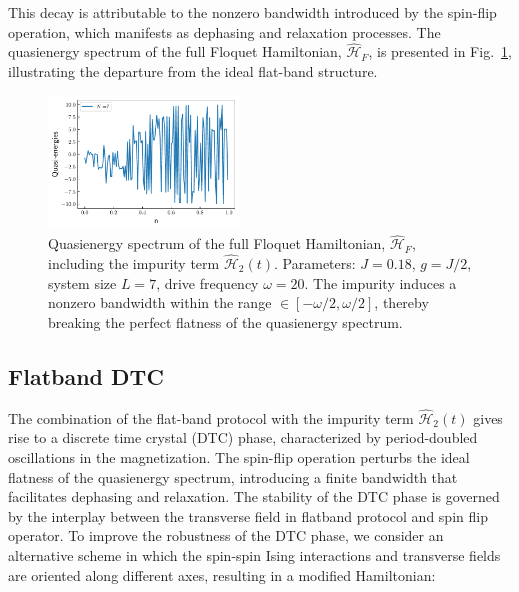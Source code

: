 \documentclass[a4paper, 10pt]{article}
\begin{document}
This decay is attributable to the nonzero bandwidth introduced by the spin-flip operation, which manifests as dephasing and relaxation processes. The quasienergy spectrum of the full Floquet Hamiltonian, $\hat{\mathcal{H}}_F$, is presented in Fig.~\ref{figs:impure_flatband_qe}, illustrating the departure from the ideal flat-band structure.
\begin{figure}[h!]
    \centering
    \includegraphics[width=0.45\textwidth]{figs/impure_flatband_qe.pdf}
    \caption{Quasienergy spectrum of the full Floquet Hamiltonian, $\hat{\mathcal{H}}_F$, including the impurity term $\hat{\mathcal{H}}_2(t)$. Parameters: $J=0.18$, $g=J/2$, system size $L=7$, drive frequency $\omega=20$. The impurity induces a nonzero bandwidth within the range $\in[-\omega/2 , \omega/2]$, thereby breaking the perfect flatness of the quasienergy spectrum.}
    \label{figs:impure_flatband_qe}
\end{figure}

\subsection{Flatband DTC}
The combination of the flat-band protocol with the impurity term $\hat{\mathcal{H}}_2(t)$ gives rise to a discrete time crystal (DTC) phase, characterized by period-doubled oscillations in the magnetization. The spin-flip operation perturbs the ideal flatness of the quasienergy spectrum, introducing a finite bandwidth that facilitates dephasing and relaxation. The stability of the DTC phase is governed by the interplay between the transverse field in flatband protocol and spin flip operator. To improve the robustness of the DTC phase, we consider an alternative scheme in which the spin-spin Ising interactions and transverse fields are oriented along different axes, resulting in a modified Hamiltonian:
\end{document}
